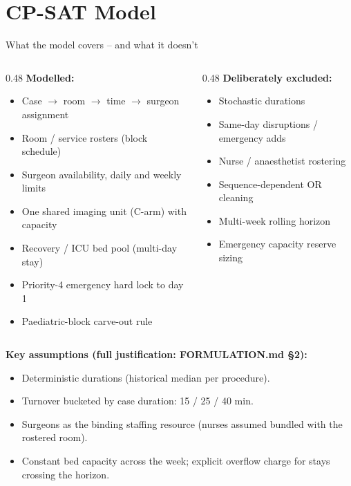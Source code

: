 \documentclass[10pt,aspectratio=169]{beamer}
\begin{document}
\section{CP-SAT Model}

\begin{frame}{What the model covers -- and what it doesn't}
  \begin{columns}
    \begin{column}{0.48\textwidth}
      \textbf{Modelled:}
      \begin{itemize}\footnotesize
        \item Case $\to$ room $\to$ time $\to$ surgeon assignment
        \item Room / service rosters (block schedule)
        \item Surgeon availability, daily and weekly limits
        \item One shared imaging unit (C-arm) with capacity
        \item Recovery / ICU bed pool (multi-day stay)
        \item Priority-4 emergency hard lock to day 1
        \item Paediatric-block carve-out rule
      \end{itemize}
    \end{column}
    \begin{column}{0.48\textwidth}
      \textbf{Deliberately excluded:}
      \begin{itemize}\footnotesize
        \item Stochastic durations
        \item Same-day disruptions / emergency adds
        \item Nurse / anaesthetist rostering
        \item Sequence-dependent OR cleaning
        \item Multi-week rolling horizon
        \item Emergency capacity reserve sizing
      \end{itemize}
    \end{column}
  \end{columns}
  \vspace{0.5em}
  \textbf{Key assumptions (full justification: FORMULATION.md \S2):}
  \begin{itemize}\footnotesize
    \item Deterministic durations (historical median per procedure).
    \item Turnover bucketed by case duration: 15 / 25 / 40 min.
    \item Surgeons as the binding staffing resource (nurses assumed
      bundled with the rostered room).
    \item Constant bed capacity across the week; explicit overflow charge
      for stays crossing the horizon.
  \end{itemize}
\end{frame}
\end{document}
